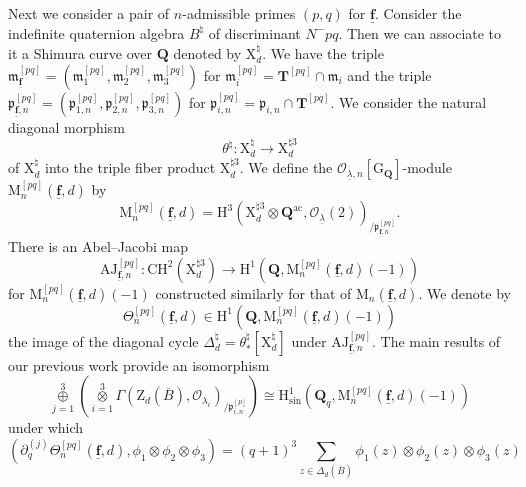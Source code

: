 \documentclass[10pt]{amsart}
\numberwithin{equation}{section}
\theoremstyle{plain}
\numberwithin{equation}{section}
\theoremstyle{definition}
\theoremstyle{remark}
\def\sing{\mathrm{sin}}
\def\ac{\mathrm{ac}}
\def\frakm{\mathfrak{m}}
\def\ac{\mathrm{ac}}
\def\undlamb{\underline{\lambda}}
\def\triplef{\underline{\mathbf{f}}}
\def\threetensor{\overset{3}{\underset{i=1}\otimes}}
\def\threesum{\overset{3}{\underset{j=1}\oplus} }
\def\calO{\mathcal{O}}
\def\frakm{\mathfrak{m}}
\def\frakp{\mathfrak{p}}
\def\QQ{\mathbf{Q}}
\def\TT{\mathbf{T}}
\def\rmG{\mathrm{G}}
\def\rmH{\mathrm{H}}
\def\rmM{\mathrm{M}}
\def\rmX{\mathrm{X}}
\def\rmZ{\mathrm{Z}}
\begin{document}
Next we consider a pair of $n$-admissible primes $(p, q)$ for $\triplef$. Consider the indefinite quaternion algebra $B^{\natural}$ of discriminant $N^{-}pq$. Then we can associate to it a Shimura curve over $\QQ$ denoted by $\rmX^{\natural}_{d}$. 
We have the triple $\frakm^{[pq]}_{\triplef}=(\frakm^{[pq]}_{1},\frakm^{[pq]}_{2}, \frakm^{[pq]}_{3})$ for $\frakm^{[pq]}_{i}=\TT^{[pq]}\cap \frakm_{i}$ and the triple $\frakp^{[pq]}_{\triplef,n}=(\frakp^{[pq]}_{1, n},\frakp^{[pq]}_{2,n}, \frakp^{[pq]}_{3,n})$ for $\frakp^{[pq]}_{i,n}=\frakp_{i, n}\cap\TT^{[pq]}$. We  consider the natural diagonal morphism 
\begin{equation*}
\theta^{\natural}: \rmX^{\natural}_{d}\rightarrow \rmX^{\natural3}_{d}
\end{equation*}
of $\rmX^{\natural}_{d}$ into the triple fiber product $\rmX^{\natural3}_{d}$. We define the $\calO_{\undlamb, n}[\rmG_{\QQ}]$-module $\rmM^{[{pq}]}_{n}(\triplef, d)$ by 
\begin{equation*}
\rmM^{[{pq}]}_{n}(\triplef, d)=\rmH^{3}(\rmX^{\natural3}_{d}\otimes{\QQ^{\ac}}, \calO_{\undlamb}(2))_{/\frakp^{[pq]}_{\triplef, n}}.
\end{equation*}
There is
an Abel--Jacobi map 
\begin{equation*}
\mathrm{AJ}^{[pq]}_{\triplef, n}: \mathrm{CH}^{2}(\rmX^{\natural3}_{d})\rightarrow \rmH^{1}(\QQ,  \rmM^{[pq]}_{n}(\triplef,d)(-1))
\end{equation*}
for $\rmM^{[pq]}_{n}(\triplef,d)(-1)$ constructed similarly for that of $\rmM_{n}(\triplef, d)$. We denote by 
\begin{equation*}
\Theta^{[pq]}_{n}(\triplef, d)\in \rmH^{1}(\QQ,  \rmM^{[pq]}_{n}(\triplef, d)(-1)) 
\end{equation*}
the image of the diagonal cycle $\Delta^{\natural}_{d}=\theta^{\natural}_{*}[\rmX^{\natural}_{d}]$ under $\mathrm{AJ}^{[pq]}_{\triplef, n}$. The main results of our previous work \cite[Theorem 4.7]{Wang} provide an isomorphism 
\begin{equation*}
\threesum(\threetensor\Gamma(\rmZ_{d}(\overline{B}),\calO_{\lambda_{i}})_{/\frakp^{[p]}_{i, n}})\cong\rmH^{1}_{\sing}(\QQ_{q},  \rmM^{[pq]}_{n}(\triplef, d)(-1))
\end{equation*}
under which
\begin{equation}\label{rami-reci}
 (\partial^{(j)}_{q}\Theta^{[pq]} _{n}(\triplef, d), \phi_{1}\otimes \phi_{2}\otimes \phi_{3})=(q+1)^{3}\sum_{z\in \Delta_{d}(\overline{B})} \phi_{1}(z)\otimes \phi_{2}(z)\otimes \phi_{3}(z)
 \end{equation} 
\end{document}
